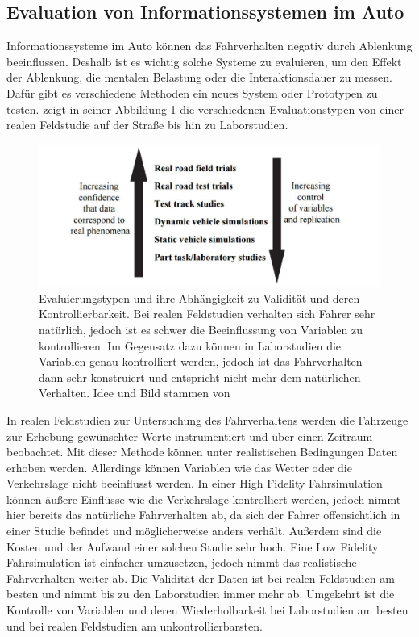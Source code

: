 \subsection[Evaluation von IVIS]{Evaluation von Informationssystemen im Auto}
Informationssysteme im Auto können das Fahrverhalten negativ durch Ablenkung beeinflussen. 
Deshalb ist es wichtig solche Systeme zu evaluieren, um den Effekt der Ablenkung, die mentalen Belastung oder die Interaktionsdauer zu messen. 
Dafür gibt es verschiedene Methoden ein neues System oder Prototypen zu testen. 
\citet{burnett2008designing} zeigt in seiner Abbildung \ref{fig:Evaluation_of_in_car_computing_devices_Burnett2008} die verschiedenen Evaluationstypen von einer realen Feldstudie auf der Straße bis hin zu Laborstudien. 
\begin{figure}
	\centering
		\includegraphics[width=1\textwidth]{img/Evaluation_of_in_car_computing_devices_Burnett2008.jpg}
	\caption[Evaluierungstypen und ihre Abhängigkeit zu Validität und deren Kontrollierbarkeit]{
Evaluierungstypen und ihre Abhängigkeit zu Validität und deren Kontrollierbarkeit. 
Bei realen Feldstudien verhalten sich Fahrer sehr natürlich, jedoch ist es schwer die Beeinflussung von Variablen zu kontrollieren. 
Im Gegensatz dazu können in Laborstudien die Variablen genau kontrolliert werden, jedoch ist das Fahrverhalten dann sehr konstruiert und entspricht nicht mehr dem natürlichen Verhalten. 
Idee und Bild stammen von \citet{burnett2008designing}}
	\label{fig:Evaluation_of_in_car_computing_devices_Burnett2008}
\end{figure}

In realen Feldstudien zur Untersuchung des Fahrverhaltens werden die Fahrzeuge zur Erhebung gewünschter Werte instrumentiert und über einen Zeitraum beobachtet. 
Mit dieser Methode können unter realistischen Bedingungen Daten erhoben werden. 
Allerdings können Variablen wie das Wetter oder die Verkehrslage nicht beeinflusst werden. 
In einer High Fidelity Fahrsimulation können äußere Einflüsse wie die Verkehrslage kontrolliert werden, jedoch nimmt hier bereits das natürliche Fahrverhalten ab, da sich der Fahrer offensichtlich in einer Studie befindet und möglicherweise anders verhält. 
Außerdem sind die Kosten und der Aufwand einer solchen Studie sehr hoch. 
Eine Low Fidelity Fahrsimulation ist einfacher umzusetzen, jedoch nimmt das realistische Fahrverhalten weiter ab. 
Die Validität der Daten ist bei realen Feldstudien am besten und nimmt bis zu den Laborstudien immer mehr ab. 
Umgekehrt ist die Kontrolle von Variablen und deren Wiederholbarkeit bei Laborstudien am besten und bei realen Feldstudien am unkontrollierbarsten.

